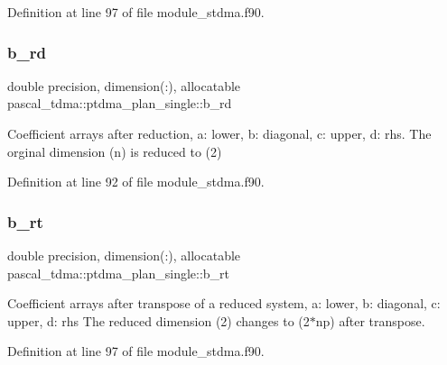 Definition at line 97 of file module\+\_\+stdma.\+f90.

\mbox{\label{structpascal__tdma_1_1ptdma__plan__single_acf24e954fa50a47ece2c59598b81c157}} 
\subsubsection{\texorpdfstring{b\_rd}{b\_rd}}
{\footnotesize\ttfamily double precision, dimension(\+:), allocatable pascal\+\_\+tdma\+::ptdma\+\_\+plan\+\_\+single\+::b\+\_\+rd}



Coefficient arrays after reduction, a\+: lower, b\+: diagonal, c\+: upper, d\+: rhs. The orginal dimension (n) is reduced to (2) 



Definition at line 92 of file module\+\_\+stdma.\+f90.

\mbox{\label{structpascal__tdma_1_1ptdma__plan__single_a8e9487525ccef0d45c8a5440103613b0}} 
\subsubsection{\texorpdfstring{b\_rt}{b\_rt}}
{\footnotesize\ttfamily double precision, dimension(\+:), allocatable pascal\+\_\+tdma\+::ptdma\+\_\+plan\+\_\+single\+::b\+\_\+rt}



Coefficient arrays after transpose of a reduced system, a\+: lower, b\+: diagonal, c\+: upper, d\+: rhs The reduced dimension (2) changes to (2$\ast$np) after transpose. 



Definition at line 97 of file module\+\_\+stdma.\+f90.

\mbox{\label{structpascal__tdma_1_1ptdma__plan__single_a9450979ebd66ed321f27165c8e13629f}} 
